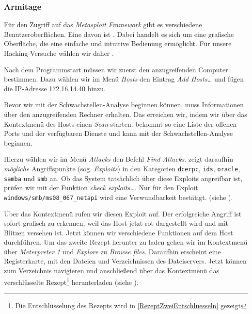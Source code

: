 \subsubsection{Armitage}

Für den Zugriff auf das \emph{Metasploit Framework} gibt es verschiedene
Benutzeroberflächen.  Eine davon ist \Armitage{}. Dabei handelt es sich um eine
grafische Oberfläche, die eine einfache und intuitive Bedienung ermöglicht. Für
unsere Hacking-Versuche wählen wir daher \Armitage.

Nach dem Programmstart müssen wir zuerst den anzugreifenden Computer
bestimmen. Dazu wählen wir im Menü \emph{Hosts} den Eintrag \emph{\glqq{}Add
  Hosts\ldots{}\grqq{}} und fügen die IP-Adresse 172.16.14.40 hinzu.

Bevor wir mit der Schwachstellen-Analyse beginnen können, muss \Armitage{}
Informationen über den anzugreifenden Rechner erhalten. Das erreichen wir, indem
wir über das Kontextmenü des Hosts einen \emph{Scan} starten. \Armitage{}
bekommt so eine Liste der offenen Ports und der verfügbaren Dienste und kann mit
der Schwachstellen-Analyse beginnen.

Hierzu wählen wir im Menü \emph{Attacks} den Befehl \emph{\glqq{}Find
  Attacks\grqq{}}. \Armitage{} zeigt daraufhin \emph{mögliche} Angriffspunkte
(sog. \emph{Exploits}) in den Kategorien \texttt{dcerpc}, \texttt{ids},
\texttt{oracle}, \texttt{samba} und \texttt{smb} an. Ob das System tatsächlich
über diese Exploits angreifbar ist, prüfen wir mit der Funktion
\emph{\glqq{}check exploits\ldots\grqq{}}. Nur für den Exploit
\texttt{windows/smb/ms08\_067\_netapi} wird eine Verwundbarkeit
bestätigt. (siehe ).


Über das Kontextmenü rufen wir diesen Exploit auf. Der erfolgreiche Angriff ist
sofort grafisch zu erkennen, weil das Host jetzt rot dargestellt wird und mit
Blitzen versehen ist. Jetzt können wir verschiedene Funktionen auf dem Host
durchführen.  Um das zweite Rezept herunter zu laden gehen wir im Kontextmenü
über \emph{Meterpreter 1} und \emph{Explore} zu \emph{\glqq{}Browse
  files\grqq{}}. Daraufhin erscheint eine Registerkarte, mit den Dateien und
Verzeichnissen des Dateiservers. Jetzt können zum Verzeichnis
 navigieren und anschließend über das Kontextmenü das
verschlüsselte Rezept\footnote{Die Entschlüsselung des Rezepts wird in
  \cref{RezeptZweiEntschluesseln} gezeigt} herunterladen (siehe
).

